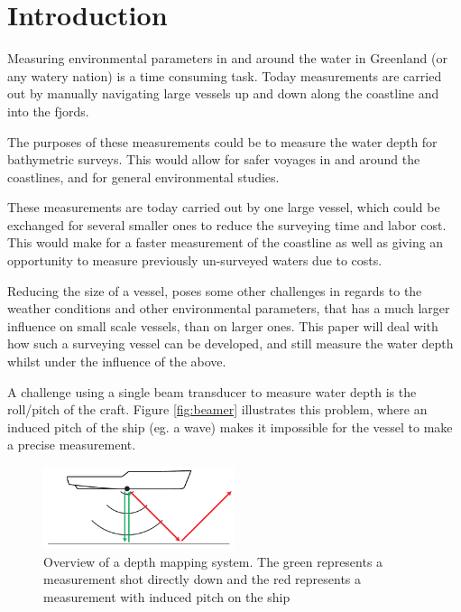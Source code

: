 \chapter{Introduction}
Measuring environmental parameters in and around the water in Greenland (or any watery nation) is a time consuming task. Today measurements are carried out by manually navigating large vessels up and down along the coastline and into the fjords. 

The purposes of these measurements could be to measure the water depth for bathymetric surveys. This would allow for safer voyages in and around the coastlines, and for general environmental studies. 

These measurements are today carried out by one large vessel, which could be exchanged for several smaller ones to reduce the surveying time and labor cost. This would make for a faster measurement of the coastline as well as giving an opportunity to measure previously un-surveyed waters due to costs. 

Reducing the size of a vessel, poses some other challenges in regards to the weather conditions and other environmental parameters, that has a much larger influence on small scale vessels, than on larger ones. This paper will deal with how such a surveying vessel can be developed, and still measure the water depth whilst under the influence of the above.

A challenge using a single beam transducer to measure water depth is the roll/pitch of the craft. Figure \vref{fig:beamer} illustrates this problem, where an induced pitch of the ship (eg. a wave) makes it impossible for the vessel to make a precise measurement.

\begin{figure}[h]
\centering
\includegraphics[width=0.5\textwidth]{img/beamer}
\caption{Overview of a depth mapping system. The green represents a measurement shot directly down and the red represents a measurement with induced pitch on the ship}
\label{fig:beamer}
\end{figure}

